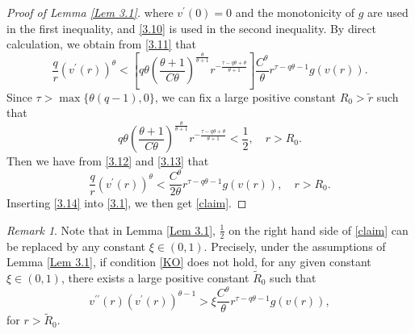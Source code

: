\documentclass[a4paper,11pt]{amsart}
\theoremstyle{plain}
\theoremstyle{remark}
\newtheorem{remark}{Remark}
\numberwithin{equation}{section}
\numberwithin{figure}{section}
\numberwithin{remark}{section}
\begin{document}
\begin{sloppypar}
\begin{proof}[Proof of Lemma \ref{Lem 3.1}]
where $v^\prime(0)=0$ and the monotonicity of $g$ are used in the first inequality, and \eqref{3.10} is used in the second inequality.
By direct calculation, we obtain from \eqref{3.11} that
\begin{equation}\label{3.12}
\frac{q}{r}\left( v^{\prime}(r)\right)^{\theta}< \left[ q \theta \left (\frac{\theta+1}{C\theta} \right )^{\frac{\theta}{\theta+1}}r^{-\frac{\tau - q\theta + \theta}{\theta+1}}\right ]\frac{C^\theta}{\theta} r^{\tau - q \theta -1} g(v(r)).
\end{equation}
Since $\tau > \max \{\theta (q-1), 0\}$, we can fix a large positive constant $R_0 > \tilde r$ such that
\begin{equation}\label{3.13}
q \theta \left (\frac{\theta+1}{C\theta} \right )^{\frac{\theta}{\theta+1}}r^{-\frac{\tau - q\theta + \theta}{\theta+1}} < \frac{1}{2}, \quad r>R_0.
\end{equation}
Then we have from \eqref{3.12} and \eqref{3.13} that 
\begin{equation}\label{3.14}
\frac{q}{r}\left( v^{\prime}(r)\right)^{\theta}< \frac{C^\theta}{2\theta} r^{\tau - q \theta -1} g(v(r)),\quad r>R_0.
\end{equation}
Inserting \eqref{3.14} into \eqref{3.1}, we then get \eqref{claim}.
\end{proof}

\begin{remark}
Note that in Lemma \ref{Lem 3.1}, $\frac{1}{2}$ on the right hand side of \eqref{claim} can be replaced by any constant $\xi \in (0,1)$. Precisely, under the assumptions of Lemma \ref{Lem 3.1}, if condition \eqref{KO} does not hold, for any given constant $\xi \in (0,1)$, there exists a large positive constant $\tilde R_0$ such that
\begin{equation}\label{claim'}
v^{\prime\prime}(r)\left( v^{\prime}(r)\right)^{\theta -1} > \xi \frac{C^\theta}{\theta} r^{\tau - q \theta -1} g(v(r)),
\end{equation}
for $r>\tilde R_0$.
\end{remark}




\end{sloppypar}
\end{document}
